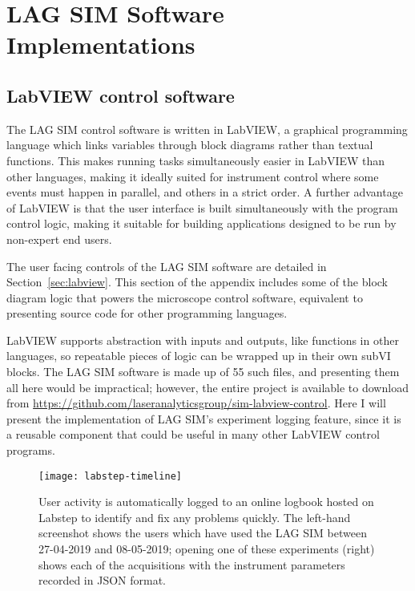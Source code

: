 \chapter{LAG SIM Software Implementations} 

\ifpdf
    \graphicspath{{Appendix1/Figs/Raster/}{Appendix1/Figs/PDF/}{Appendix1/Figs/}}
\else
    \graphicspath{{Appendix1/Figs/Vector/}{Appendix1/Figs/}}
\fi

\section{LabVIEW control software} \label{appx:labview-lagsim}
The LAG SIM control software is written in LabVIEW, a graphical programming language which links variables through block diagrams rather than textual functions. 
This makes running tasks simultaneously easier in LabVIEW than other languages, making it ideally suited for instrument control where some events must happen in parallel, and others in a strict order.
A further advantage of LabVIEW is that the user interface is built simultaneously with the program control logic, making it suitable for building applications designed to be run by non-expert end users. 

The user facing controls of the LAG SIM software are detailed in Section~\ref{sec:labview}. 
This section of the appendix includes some of the block diagram logic that powers the microscope control software, equivalent to presenting source code for other programming languages. 

LabVIEW supports abstraction with inputs and outputs, like functions in other languages, so repeatable pieces of logic can be wrapped up in their own subVI blocks. 
The LAG SIM software is made up of 55 such files, and presenting them all here would be impractical; however, the entire project is available to download from \url{https://github.com/laseranalyticsgroup/sim-labview-control}. 
Here I will present the implementation of LAG SIM's experiment logging feature, since it is a reusable component that could be useful in many other LabVIEW control programs. 

\begin{sidewaysfigure}[p]
\centering
\texttt{[image: labstep-timeline]}
\caption[Logging user activity with Labstep allows any problems to be identified and fixed quickly]{User activity is automatically logged to an online logbook hosted on Labstep to identify and fix any problems quickly. The left-hand screenshot shows the users which have used the LAG SIM between 27-04-2019 and 08-05-2019; opening one of these experiments (right) shows each of the acquisitions with the instrument parameters recorded in JSON format.}
\label{fig:labstepTimeline}
\end{sidewaysfigure}

